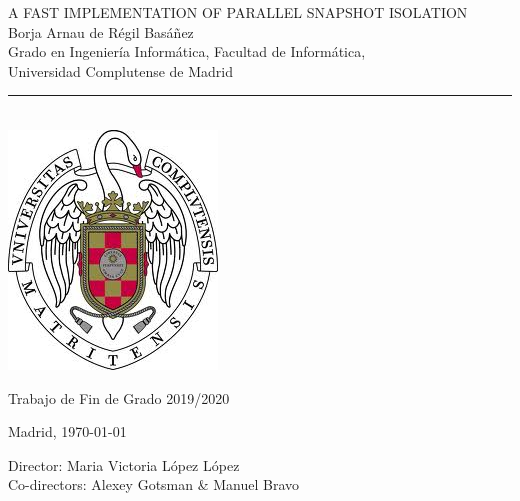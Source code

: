 \newpage
\thispagestyle{empty}
\begin{center}
   \vspace{1cm}
   {\Large A FAST IMPLEMENTATION OF PARALLEL SNAPSHOT ISOLATION}\\
   \vspace{0.5cm}
   \vspace{0.5cm}
   {\large Borja Arnau de Régil Basáñez}\\
   \vspace{0.5cm}
   Grado en Ingeniería Informática, Facultad de Informática,\\
   Universidad Complutense de Madrid \\
   \vspace{0.65cm}
   \rule{2in}{0.5pt}\\
   \vspace{0.85cm}
   \includegraphics[height=2.5in]{figures/escudo.jpg}

   \vspace{0.5cm}
   Trabajo de Fin de Grado 2019/2020
   \vspace{0.5cm}

     Madrid, \today\\
   \vspace{1cm}
\end{center}

{\raggedleft
   \vspace{1cm}
   Director: Maria Victoria López López\\
   Co-directors: Alexey Gotsman \& Manuel Bravo\\
}
